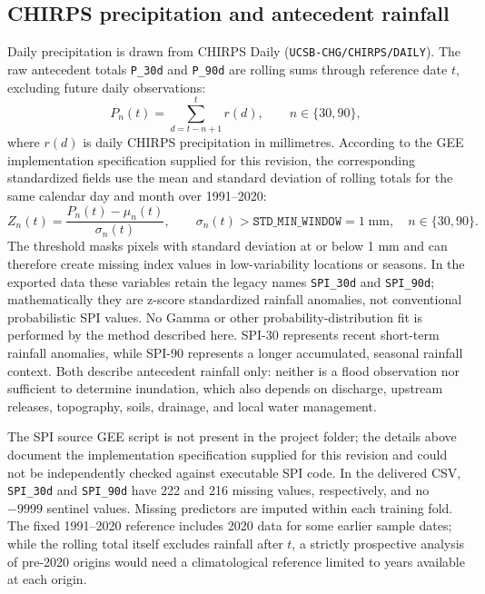 \documentclass[pdflatex,sn-mathphys,Numbered]{sn-jnl}
\begin{document}
\subsection{CHIRPS precipitation and antecedent rainfall}
Daily precipitation is drawn from CHIRPS Daily (\texttt{UCSB-CHG/CHIRPS/DAILY}). The raw antecedent totals \texttt{P\_30d} and \texttt{P\_90d} are rolling sums through reference date $t$, excluding future daily observations:
\begin{equation}
P_n(t)=\sum_{d=t-n+1}^{t}r(d),\qquad n\in\{30,90\},
\end{equation}
where $r(d)$ is daily CHIRPS precipitation in millimetres. According to the GEE implementation specification supplied for this revision, the corresponding standardized fields use the mean and standard deviation of rolling totals for the same calendar day and month over 1991--2020:
\begin{equation}
Z_n(t)=\frac{P_n(t)-\mu_n(t)}{\sigma_n(t)},\qquad
\sigma_n(t)>\texttt{STD\_MIN\_WINDOW}=1\;\mathrm{mm},
\quad n\in\{30,90\}.
\end{equation}
The threshold masks pixels with standard deviation at or below 1 mm and can therefore create missing index values in low-variability locations or seasons. In the exported data these variables retain the legacy names \texttt{SPI\_30d} and \texttt{SPI\_90d}; mathematically they are z-score standardized rainfall anomalies, not conventional probabilistic SPI values. No Gamma or other probability-distribution fit is performed by the method described here. SPI-30 represents recent short-term rainfall anomalies, while SPI-90 represents a longer accumulated, seasonal rainfall context. Both describe antecedent rainfall only: neither is a flood observation nor sufficient to determine inundation, which also depends on discharge, upstream releases, topography, soils, drainage, and local water management.

The SPI source GEE script is not present in the project folder; the details above document the implementation specification supplied for this revision and could not be independently checked against executable SPI code. In the delivered CSV, \texttt{SPI\_30d} and \texttt{SPI\_90d} have 222 and 216 missing values, respectively, and no $-9999$ sentinel values. Missing predictors are imputed within each training fold. The fixed 1991--2020 reference includes 2020 data for some earlier sample dates; while the rolling total itself excludes rainfall after $t$, a strictly prospective analysis of pre-2020 origins would need a climatological reference limited to years available at each origin.
\end{document}
